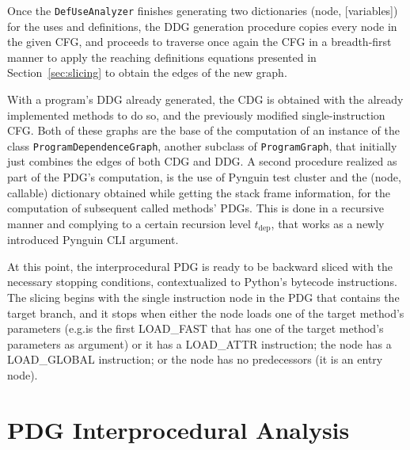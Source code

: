 \documentclass[%
  chapterprefix=false,%
  open=right,%
  twoside=true,%
  paper=a4,%
  logofile={Figures/logo.png},%
  thesistype=master,%
  UKenglish,%
]{se2thesis}
\newcommand{\classname}[1]{\texttt{#1}}
\begin{document}

Once the \classname{DefUseAnalyzer} finishes generating two dictionaries (node, [variables]) for the uses and definitions, the DDG generation procedure copies every node in the given CFG, and proceeds to traverse once again the CFG in a breadth-first manner to apply the reaching definitions equations presented in Section~\ref{sec:slicing} to obtain the edges of the new graph.

With a program's DDG already generated, the CDG is obtained with the already implemented methods to do so, and the previously modified single-instruction CFG.\@
Both of these graphs are the base of the computation of an instance of the class \classname{ProgramDependenceGraph}, another subclass of \classname{ProgramGraph}, that initially just combines the edges of both CDG and DDG.\@
A second procedure realized as part of the PDG's computation, is the use of Pynguin test cluster and the (node, callable) dictionary obtained while getting the stack frame information, for the computation of subsequent called methods' PDGs.
This is done in a recursive manner and complying to a certain recursion level \(t_{\text{dep}}\), that works as a newly introduced Pynguin CLI argument. 

At this point, the interprocedural PDG is ready to be backward sliced with the necessary stopping conditions, contextualized to Python's bytecode instructions.
The slicing begins with the single instruction node in the PDG that contains the target branch, and it stops when either the node loads one of the target method's parameters (e.g.\@it is the first LOAD\_FAST that has one of the target method's parameters as argument) or it has a LOAD\_ATTR instruction; the node has a LOAD\_GLOBAL instruction; or the node has no predecessors (it is an entry node).

\section{PDG Interprocedural Analysis}
\end{document}
